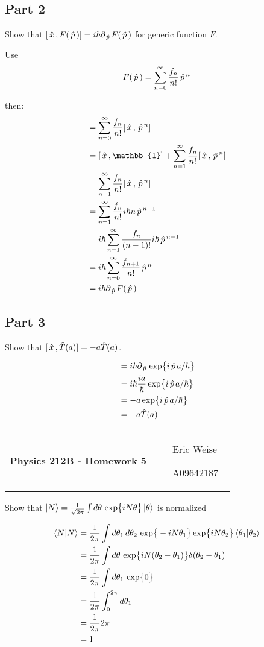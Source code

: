 \documentclass{article}
\newcommand{\assignment}[1]{
    \newpage
    \begin{tabular}{p{0.65\linewidth}p{0.25\linewidth}}
        {\bf\LARGE Physics 212B - Homework #1 }
        &
        \parbox[b]{0.24\textwidth}{
            \hfill Eric Weise

            \hfill A09642187
            }
    \end{tabular}
    \vspace{12pt}
    \newline
}
\newcommand{\D}[1]{{d#1 \,}}
\renewcommand{\exp}[1]{\,\text{exp} \big\{ #1 \big\} }
\begin{document}
\subsection*{Part 2}
Show that
\( [\, \hat{x} \,, F(\, \hat{p} \,)] = i\hbar\partial_{\, \hat{p} \,} F(\, \hat{p} \,) \)
for generic function $F$.

Use
\[ F(\, \hat{p} \,) = \sum_{n=0}^{\infty} \frac{f_n}{n!} \, \hat{p} \,^n \]

then:
\begin{align*}
    [\xopr, F(\popr)]
    &= \sum_{n=0}^{\infty} \frac{f_n}{n!} [\xopr, \popr^n ] \\
    &= [\xopr, \mathbb{1}]  + \sum_{n=1}^{\infty} \frac{f_n}{n!} [\xopr, \popr^n ] \\
    &= \sum_{n=1}^{\infty} \frac{f_n}{n!} [\xopr, \popr^n ] \\
    &= \sum_{n=1}^{\infty} \frac{f_n}{n!} i\hbar n \popr^{n-1} \\
    &= i\hbar \sum_{n=1}^{\infty} \frac{f_n}{(n-1)!} i\hbar \popr^{n-1} \\
    &= i\hbar \sum_{n=0}^{\infty} \frac{f_{n+1}}{n!} \popr^{n} \\
    &= i\hbar \partial_{\popr} F(\popr)
\end{align*}

\subsection*{Part 3}
Show that
\( [\, \hat{x} \,, \hat{T}(a) ] = -a \hat{T}(a) \).

\begin{align*}
    [\xopr, \hat{T}(a) ]
    &= i\hbar \partial_{\popr} \exp{i\popr a / \hbar} \\
    &= i\hbar \frac{i a}{\hbar} \exp{i\popr a / \hbar} \\
    &= -a \exp{i\popr a / \hbar} \\
    &= -a \hat{T}(a)
\end{align*}


\assignment{5}
Show that
\( \ket{N} = \frac{1}{\sqrt{2\pi}} \int \D{\theta} \exp{i N \theta} \ket{\theta} \)
is normalized

\begin{align*}
    \braket{N|N}
    &= \frac{1}{2\pi} \int \D{\theta_1}\D{\theta_2} \exp{-i N \theta_1} \exp{i N \theta_2} \braket{\theta_1|\theta_2} \\
    &= \frac{1}{2\pi} \int \D{\theta} \exp{i N (\theta_2 - \theta_1)} \delta(\theta_2 - \theta_1) \\
    &= \frac{1}{2\pi} \int \D{\theta_1} \exp{0} \\
    &= \frac{1}{2\pi} \int_{0}^{2\pi} \D{\theta_1} \\
    &= \frac{1}{2\pi} 2\pi \\
    &= 1
\end{align*}
\end{document}
